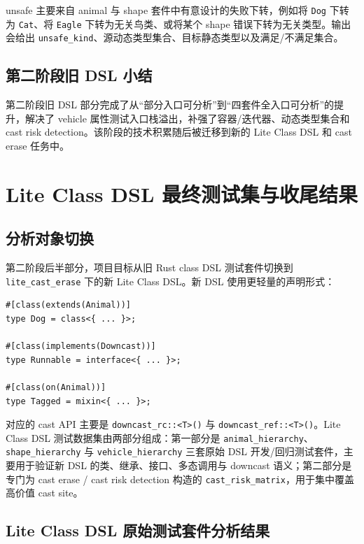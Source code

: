 \documentclass[10.5pt,compsoc,UTF8]{cjc}
\theoremstyle{mystyle}
\begin{document}
unsafe 主要来自 animal 与 shape 套件中有意设计的失败下转，例如将 \texttt{Dog} 下转为 \texttt{Cat}、将 \texttt{Eagle} 下转为无关鸟类、或将某个 shape 错误下转为无关类型。输出会给出 \texttt{unsafe\_kind}、源动态类型集合、目标静态类型以及满足/不满足集合。

\subsection{第二阶段旧 DSL 小结}

第二阶段旧 DSL 部分完成了从“部分入口可分析”到“四套件全入口可分析”的提升，解决了 vehicle 属性测试入口栈溢出，补强了容器/迭代器、动态类型集合和 cast risk detection。该阶段的技术积累随后被迁移到新的 Lite Class DSL 和 cast erase 任务中。

\newpage
\doublespacing
\thispagestyle{empty}

{\raggedright
{}
\section{\heiti\centering Lite Class DSL 最终测试集与收尾结果}}

\subsection{分析对象切换}

第二阶段后半部分，项目目标从旧 Rust class DSL 测试套件切换到 \texttt{lite\_cast\_erase} 下的新 Lite Class DSL。新 DSL 使用更轻量的声明形式：

\begin{lstlisting}
#[class(extends(Animal))]
type Dog = class<{ ... }>;

#[class(implements(Downcast))]
type Runnable = interface<{ ... }>;

#[class(on(Animal))]
type Tagged = mixin<{ ... }>;
\end{lstlisting}

对应的 cast API 主要是 \texttt{downcast\_rc::<T>()} 与 \texttt{downcast\_ref::<T>()}。Lite Class DSL 测试数据集由两部分组成：第一部分是 \texttt{animal\_hierarchy}、\texttt{shape\_hierarchy} 与 \texttt{vehicle\_hierarchy} 三套原始 DSL 开发/回归测试套件，主要用于验证新 DSL 的类、继承、接口、多态调用与 downcast 语义；第二部分是专门为 cast erase / cast risk detection 构造的 \texttt{cast\_risk\_matrix}，用于集中覆盖高价值 cast site。

\subsection{Lite Class DSL 原始测试套件分析结果}
\end{document}
